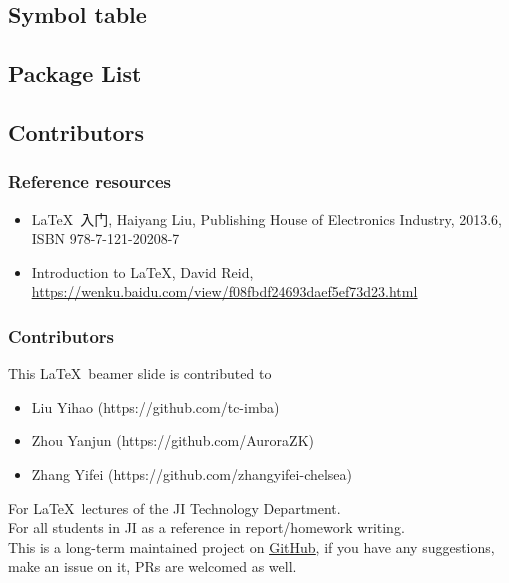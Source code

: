 \documentclass{beamer}
\begin{document}
\subsection{Symbol table}

\begin{frame}

\end{frame}

\subsection{Package List}

\begin{frame}

\end{frame}

\subsection{Contributors}

\begin{frame}
	\frametitle{Reference resources}
	\begin{CJK*}{UTF8}{gbsn}
	\begin{itemize}
		\item \LaTeX\ 入门, Haiyang Liu, Publishing House of Electronics Industry, 2013.6, ISBN 978-7-121-20208-7
		\item Introduction to \LaTeX, David Reid, \href{https://wenku.baidu.com/view/f08fbdf24693daef5ef73d23.html}{\color{blue}\uline{https://wenku.baidu.com/view/f08fbdf24693daef5ef73d23.html}}
	\end{itemize}
	\end{CJK*}
\end{frame}

\begin{frame}
	\frametitle{Contributors}
	This \LaTeX\ beamer slide is contributed to
	\begin{itemize}
	\item Liu Yihao (https://github.com/tc-imba)\\
	\item Zhou Yanjun (https://github.com/AuroraZK)\\
	\item Zhang Yifei (https://github.com/zhangyifei-chelsea)
	\end{itemize}	
	For \LaTeX\ lectures of the JI Technology Department.\\
	For all students in JI as a reference in report/homework writing.\\[0.5em]
	
	This is a long-term maintained project on \href{https://github.com/SJTU-UMJI-Tech/LaTeX}{\color{blue}\underline{GitHub}}, if you have any suggestions, make an issue on it, PRs are welcomed as well.
	
\end{frame}
\end{document}
